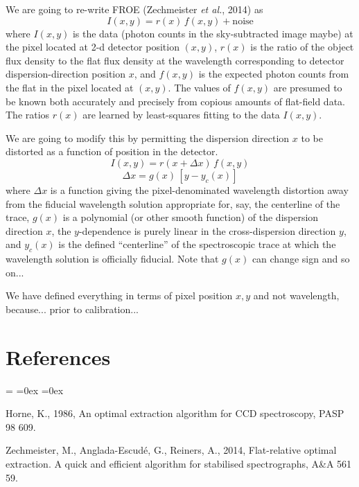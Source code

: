 \documentclass[12pt, letterpaper]{article}
\newcommand{\foreign}[1]{\textsl{#1}}
\newcommand{\etal}{\foreign{et al.}}
\begin{document}
We are going to re-write FROE (Zechmeister \etal, 2014) as
\begin{equation}
I(x,y) = r(x)\,f(x, y) + \mbox{noise}
\end{equation}
where
$I(x,y)$ is the data (photon counts in the sky-subtracted image maybe)
at the pixel located at 2-d detector position $(x,y)$,
$r(x)$ is the ratio of the object flux density to the flat flux density
at the wavelength corresponding to detector dispersion-direction position $x$, and
$f(x,y)$ is the expected photon counts from the flat in the pixel
located at $(x,y)$.
The values of $f(x,y)$ are presumed to be known both accurately and
precisely from copious amounts of flat-field data.
The ratios $r(x)$ are learned by least-squares fitting to the data
$I(x,y)$.

We are going to modify this by permitting the dispersion direction $x$
to be distorted as a function of position in the detector.
\begin{equation}
I(x,y) = r(x + \Delta x)\,f(x, y)
\end{equation}
\begin{equation}
\Delta x = g(x)\,[y - y_c(x)]
\end{equation}
where
$\Delta x$ is a function giving the pixel-denominated wavelength
distortion away from the fiducial wavelength solution appropriate for,
say, the centerline of the trace,
$g(x)$ is a polynomial (or other smooth function) of the dispersion
direction $x$,
the $y$-dependence is purely linear in the cross-dispersion direction $y$, and
$y_c(x)$ is the defined ``centerline'' of the spectroscopic trace at which the
wavelength solution is officially fiducial.
Note that $g(x)$ can change sign and so on...

We have defined everything in terms of pixel position $x, y$ and not wavelength, because... prior to calibration...

\section*{References}
\begin{list}{}{%
\rightmargin=0in
\leftmargin=\parindent
{}\leftmargin
{}\leftmargin
\itemsep=0ex
\parsep=0ex
}
\item Horne, K., 1986,
An optimal extraction algorithm for CCD spectroscopy,
PASP 98 609.
\item Zechmeister, M., Anglada-Escud\'e, G., Reiners, A., 2014,
Flat-relative optimal extraction. A quick and efficient algorithm for stabilised spectrographs,
A\&A 561 59.
\end{list}
\end{document}
